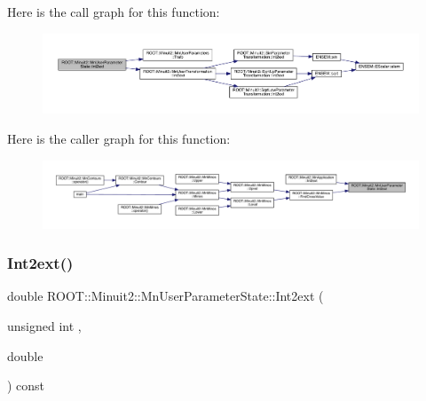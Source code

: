Here is the call graph for this function\+:
\nopagebreak
\begin{figure}[H]
\begin{center}
\leavevmode
\includegraphics[width=350pt]{d3/de0/classROOT_1_1Minuit2_1_1MnUserParameterState_a4ade4b298d85f6192ffa7d7723aa5b97_cgraph}
\end{center}
\end{figure}
Here is the caller graph for this function\+:
\nopagebreak
\begin{figure}[H]
\begin{center}
\leavevmode
\includegraphics[width=350pt]{d3/de0/classROOT_1_1Minuit2_1_1MnUserParameterState_a4ade4b298d85f6192ffa7d7723aa5b97_icgraph}
\end{center}
\end{figure}
\mbox{\label{classROOT_1_1Minuit2_1_1MnUserParameterState_a4ade4b298d85f6192ffa7d7723aa5b97}} 
\subsubsection{\texorpdfstring{Int2ext()}{Int2ext()}\hspace{0.1cm}{\footnotesize\ttfamily [3/3]}}
{\footnotesize\ttfamily double R\+O\+O\+T\+::\+Minuit2\+::\+Mn\+User\+Parameter\+State\+::\+Int2ext (\begin{DoxyParamCaption}\item[{unsigned int}]{,  }\item[{double}]{ }\end{DoxyParamCaption}) const}

\mbox{\label{classROOT_1_1Minuit2_1_1MnUserParameterState_ad4b67f98845868977a7b7d99c8ffbe2d}} 
